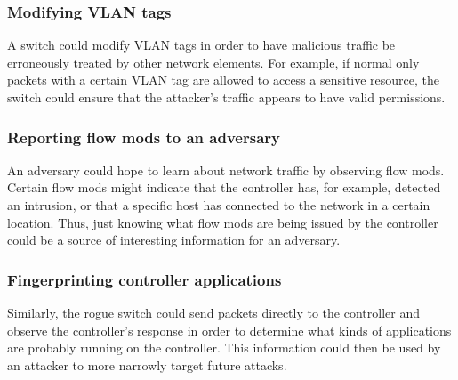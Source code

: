 \subsubsection{Modifying VLAN tags}
A switch could modify VLAN tags in order to have malicious traffic be erroneously treated by other network elements. For example, if normal only packets with a certain VLAN tag are allowed to access a sensitive resource, the switch could ensure that the attacker's traffic appears to have valid permissions. %

\subsubsection{Reporting flow mods to an adversary}
An adversary could hope to learn about network traffic by observing flow mods. Certain flow mods might indicate that the controller has, for example, detected an intrusion, or that a specific host has connected to the network in a certain location. Thus, just knowing what flow mods are being issued by the controller could be a source of interesting information for an adversary.

\subsubsection{Fingerprinting controller applications}
Similarly, the rogue switch could send packets directly to the controller and observe the controller's response in order to determine what kinds of applications are probably running on the controller. This information could then be used by an attacker to more narrowly target future attacks.
